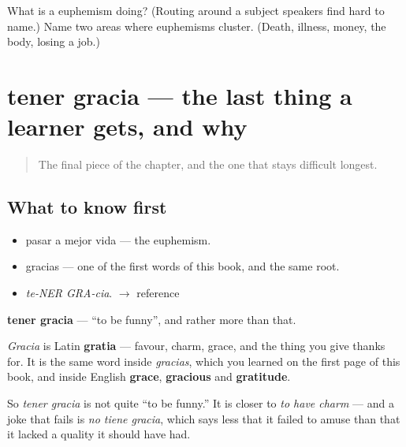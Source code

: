 \begin{tcolorbox}[breakable,colback=teal!4,colframe=teal!35!black,title={Before you move on}]
What is a euphemism doing? (Routing around a subject speakers find hard to name.) Name two areas where euphemisms cluster. (Death, illness, money, the body, losing a job.)
\end{tcolorbox}
\section[tener gracia]{tener gracia — the last thing a learner gets, and why}

\label{lesson:ES-C274-tener-gracia}



\begin{quote}
The final piece of the chapter, and the one that stays difficult longest.
\end{quote}

\subsection*{What to know first}
\begin{itemize}
\raggedright
  \item pasar a mejor vida — the euphemism.
  \item gracias — one of the first words of this book, and the same root.
\end{itemize}

\begin{sounds}
\begin{itemize}
\raggedright
  \item \emph{te-NER GRA-cia}. $\to$ reference
\end{itemize}
\end{sounds}

\begin{cousinweb}
\textbf{tener gracia} — \textquotedblleft{}to be funny\textquotedblright{}, and rather more than that.

\emph{Gracia} is Latin \textbf{gratia} — favour, charm, grace, and the thing you give thanks for. It is the same word inside \emph{gracias}, which you learned on the first page of this book, and inside English \textbf{grace}, \textbf{gracious} and \textbf{gratitude}.

So \emph{tener gracia} is not quite \textquotedblleft{}to be funny.\textquotedblright{} It is closer to \emph{to have charm} — and a joke that fails is \emph{no tiene gracia}, which says less that it failed to amuse than that it lacked a quality it should have had.
\end{cousinweb}


